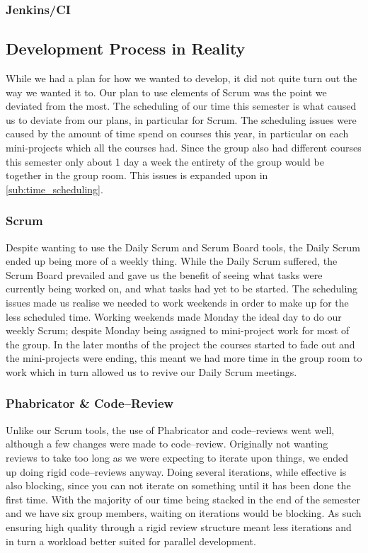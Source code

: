 \subsubsection{Jenkins/CI}
\subsection{Development Process in Reality}
While we had a plan for how we wanted to develop, it did not quite turn out the way we wanted it to.
Our plan to use elements of Scrum was the point we deviated from the most.
The scheduling of our time this semester is what caused us to deviate from our plans, in particular for Scrum.
The scheduling issues were caused by the amount of time spend on courses this year, in particular on each mini-projects which all the courses had.
Since the group also had different courses this semester only about 1 day a week the entirety of the group would be together in the group room.
This issues is expanded upon in \cref{sub:time_scheduling}.
\subsubsection{Scrum}
Despite wanting to use the Daily Scrum and Scrum Board tools, the Daily Scrum ended up being more of a weekly thing.
While the Daily Scrum suffered, the Scrum Board prevailed and gave us the benefit of seeing what tasks were currently being worked on, and what tasks had yet to be started.
The scheduling issues made us realise we needed to work weekends in order to make up for the less scheduled time.
Working weekends made Monday the ideal day to do our weekly Scrum; despite Monday being assigned to mini-project work for most of the group.
In the later months of the project the courses started to fade out and the mini-projects were ending, this meant we had more time in the group room to work which in turn allowed us to revive our Daily Scrum meetings.
\subsubsection{Phabricator \& Code--Review}
Unlike our Scrum tools, the use of Phabricator and code--reviews went well, although a few changes were made to code--review.
Originally not wanting reviews to take too long as we were expecting to iterate upon things, we ended up doing rigid code--reviews anyway.
Doing several iterations, while effective is also blocking, since you can not iterate on something until it has been done the first time.
With the majority of our time being stacked in the end of the semester and we have six group members, waiting on iterations would be blocking.
As such ensuring high quality through a rigid review structure meant less iterations and in turn a workload better suited for parallel development.
